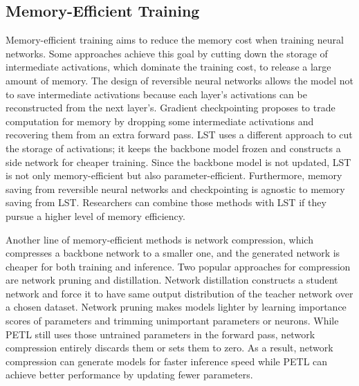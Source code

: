 \subsection{Memory-Efficient Training}
\label{sec: memory-efficient training}

Memory-efficient training aims to reduce the memory cost when training neural networks. Some approaches achieve this goal by cutting down the storage of intermediate activations, which dominate the training cost, to release a large amount of memory. The design of reversible neural networks \cite{Gomez2017TheRR,Kitaev2020Reformer,mangalam2022reversible} allows the model not to save intermediate activations because each layer's activations can be reconstructed from the next layer's. Gradient checkpointing \cite{Chen2016TrainingDN} proposes to trade computation for memory by dropping some intermediate activations and recovering them from an extra forward pass. LST uses a different approach to cut the storage of activations; it keeps the backbone model frozen and constructs a side network for cheaper training. Since the backbone model is not updated, LST is not only memory-efficient but also parameter-efficient. Furthermore, memory saving from reversible neural networks and checkpointing is agnostic to memory saving from LST. Researchers can combine those methods with LST if they pursue a higher level of memory efficiency.

Another line of memory-efficient methods is network compression, which compresses a backbone network to a smaller one, and the generated network is cheaper for both training and inference. Two popular approaches for compression are network pruning and distillation. Network distillation \cite{Hinton2015Distilling,Koratana2019LITLI} constructs a student network and force it to have same output distribution of the teacher network over a chosen dataset. Network pruning \cite{Frankle2019TheLT,Frankle2020LinearMC} makes models lighter by learning importance scores of parameters and trimming unimportant parameters or neurons. While PETL still uses those untrained parameters in the forward pass, network compression entirely discards them or sets them to zero. As a result, network compression can generate models for faster inference speed while PETL can achieve better performance by updating fewer parameters.

